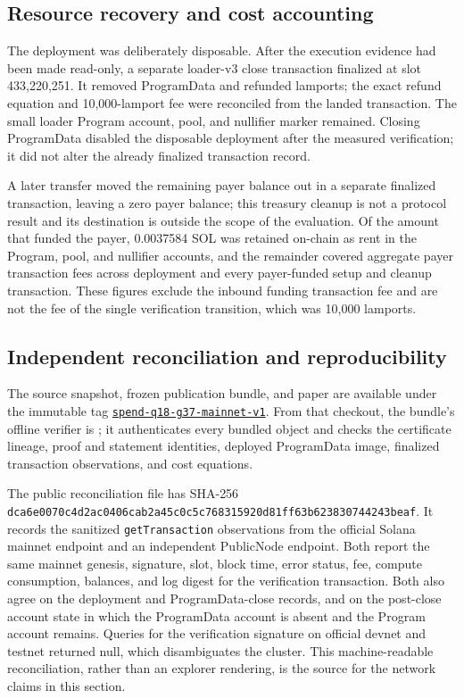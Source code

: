 \subsection{Resource recovery and cost accounting}
\label{sec:evaluation-cleanup}

The deployment was deliberately disposable.  After the execution evidence
had been made read-only, a separate loader-v3 close transaction finalized at
slot 433,220,251.  It removed ProgramData and refunded
\ProfileProgramDataRefundLamports{} lamports; the exact refund equation and
10,000-lamport fee were reconciled from the landed transaction.  The small
loader Program account, pool, and nullifier marker remained.  Closing
ProgramData disabled the disposable deployment after the measured
verification; it did not alter the already finalized transaction record.

A later transfer moved the remaining payer balance out in a separate
finalized transaction, leaving a zero payer balance; this treasury cleanup is
not a protocol result and its destination is outside the scope of the
evaluation.  Of the amount that funded the payer, 0.0037584 SOL was retained
on-chain as rent in the Program, pool, and nullifier accounts, and the
remainder covered aggregate payer transaction fees across deployment and every
payer-funded setup and cleanup transaction.  These figures exclude the inbound
funding transaction fee and are not the fee of the single verification
transition, which was 10,000 lamports.

\subsection{Independent reconciliation and reproducibility}
\label{sec:evaluation-reproduction}

The source snapshot, frozen publication bundle, and paper are available under
the immutable tag
\href{https://github.com/DJBarker87/zk/tree/aspis-spend-q18-g37-mainnet-v1}{\texttt{spend-q18-g37-mainnet-v1}}.
From that checkout, the bundle's offline verifier is
; it authenticates every
bundled object and checks the certificate lineage, proof and statement
identities, deployed ProgramData image, finalized transaction observations,
and cost equations.

The public reconciliation file
has SHA-256
\nolinkurl{dca6e0070c4d2ac0406cab2a45c0c5c768315920d81ff63b623830744243beaf}.
It records the sanitized \texttt{getTransaction} observations from the official
Solana mainnet endpoint and an independent PublicNode endpoint.  Both report
the same mainnet genesis, signature, slot, block time, error status, fee,
compute consumption, balances, and log digest for the verification
transaction.  Both also agree on the deployment and ProgramData-close records,
and on the post-close account state in which the ProgramData account is absent
and the Program account remains.  Queries for the verification signature on
official devnet and testnet returned null, which disambiguates the cluster.
This machine-readable reconciliation, rather than an explorer rendering, is the
source for the network claims in this section.

